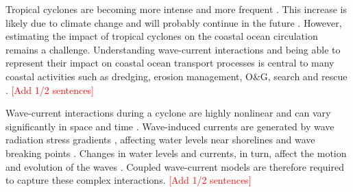 \documentclass[preprint,12pt,authoryear]{elsarticle}
\newcommand{\ie}{{\it i.e.}\ }
\begin{document}


Tropical cyclones are becoming more intense and more frequent \citep{bhatia2019recent, kossin2020global}. This increase is likely due to climate change and will probably continue in the future \citep{knutson2020tropical}. However, estimating the impact of tropical cyclones on the coastal ocean circulation remains a challenge. Understanding wave-current interactions and being able to represent their impact on coastal ocean transport processes is central to many coastal activities such as dredging, erosion management, O\&G, search and rescue \citep{bever2013simulating,li1998three, breivik2013advances}. \textcolor{red}{[Add 1/2 sentences]}

Wave-current interactions during a cyclone are highly nonlinear and can vary significantly in space and time \citep{wu2011fvcom}. Wave-induced currents are generated by wave radiation stress gradients \citep{longuet1970longshore}, affecting water levels near shorelines and wave breaking points \citep{longuet1964radiation}. Changes in water levels and currents, in turn, affect the motion and evolution of the waves \citep{sikiric2013coupling}. Coupled wave-current models are therefore required to capture these complex interactions. \textcolor{red}{[Add 1/2 sentences]}
\end{document}
